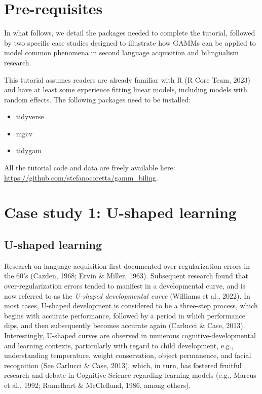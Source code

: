 \documentclass[
  letterpaper,
  DIV=11,
  numbers=noendperiod]{scrartcl}
\begin{document}
\section{Pre-requisites}\label{pre-requisites}

In what follows, we detail the packages needed to complete the tutorial,
followed by two specific case studies designed to illustrate how GAMMs
can be applied to model common phenomena in second language acquisition
and bilingualism research.

This tutorial assumes readers are already familiar with R (R Core Team,
2023) and have at least some experience fitting linear models, including
models with random effects. The following packages need to be installed:

\begin{itemize}
\item
  tidyverse
\item
  mgcv
\item
  tidygam
\end{itemize}

All the tutorial code and data are freely available here:
\url{https://github.com/stefanocoretta/gamm_biling}.

\section{Case study 1: U-shaped
learning}\label{case-study-1-u-shaped-learning}

\subsection{U-shaped learning}\label{u-shaped-learning}

Research on language acquisition first documented over-regularization
errors in the 60's (Cazden, 1968; Ervin \& Miller, 1963). Subsequent
research found that over-regularization errors tended to manifest in a
developmental curve, and is now referred to as the \emph{U-shaped
developmental curve} (Williams et al., 2022). In most cases, U-shaped
development is considered to be a three-step process, which begins with
accurate performance, followed by a period in which performance dips,
and then subsequently becomes accurate again (Carlucci \& Case, 2013).
Interestingly, U-shaped curves are observed in numerous
cognitive-developmental and learning contexts, particularly with regard
to child development, e.g., understanding temperature, weight
conservation, object permanence, and facial recognition (See Carlucci \&
Case, 2013), which, in turn, has fostered fruitful research and debate
in Cognitive Science regarding learning models (e.g., Marcus et al.,
1992; Rumelhart \& McClelland, 1986, among others).
\end{document}
